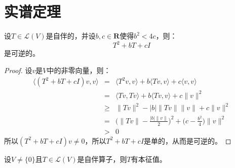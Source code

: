 \documentclass[10pt,a4paper,UTF8]{article}
\begin{document}
\section{实谱定理}
\label{sec:org3e9e8d3}


\begin{tikztheorem}
设\(T\in \mathcal{L}(V)\)是自伴的，并设\(b,c\in \mathbf{R}\)使得\(b^{2} < 4c\)，则：
\begin{equation}
\label{eq:6}
T^{2} + bT +cI
\end{equation}
是可逆的。
\end{tikztheorem}

\begin{proof}
设\(v\)是\(V\)中的非零向量，则：
\begin{eqnarray*}
\langle (T^{2}+bT + cI)v ,v \rangle  &=& \langle T^{2}v,v \rangle +b \langle Tv,v \rangle + c \langle v,v \rangle  \\
&=& \langle Tv, Tv \rangle  + b \langle Tv,v \rangle + c\|v\|^{2} \\
&\geq& \|Tv\|^{2} - |b| \|Tv\| \|v\| + c \|v\|^{2} \\
&=& \bigg( \|Tv\| - \frac{|b|\|v\|}{2} \bigg)^{2} + \bigg( c - \frac{b^{2}}{4} \bigg) \|v\|^{2} \\
&>&0
\end{eqnarray*}
所以\((T^{2} + bT + cI)v \neq 0\)，所以\(T^{2} + bT + cI\)是单的，从而是可逆的。
\end{proof}

\begin{tikztheorem}
设\(V\neq \{0\}\)且\(T\in \mathcal{L}(V)\)是自伴算子，则\(T\)有本征值。
\end{tikztheorem}
\end{document}
